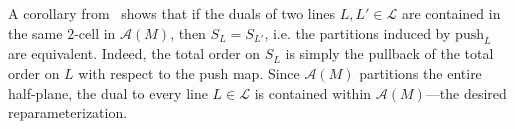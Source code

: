 \documentclass[sn-mathphys]{sn-jnl}
\begin{document}
A corollary from~\cite{lesnick2015interactive} shows that if the duals of two lines $L, L' \in \mathcal{L}$ are contained in the same $2$-cell in $\mathcal{A}(M)$, then $S_L = S_{L'}$, i.e. the partitions induced by $\mathrm{push}_L$ are equivalent. Indeed, the total order on $S_L$ is simply the pullback of the total order on $L$ with respect to the push map.
Since $\mathcal{A}(M)$ partitions the entire half-plane, the dual to every line $L \in \mathcal{L}$ is contained within $\mathcal{A}(M)$---the desired reparameterization. 

 
\end{document}
